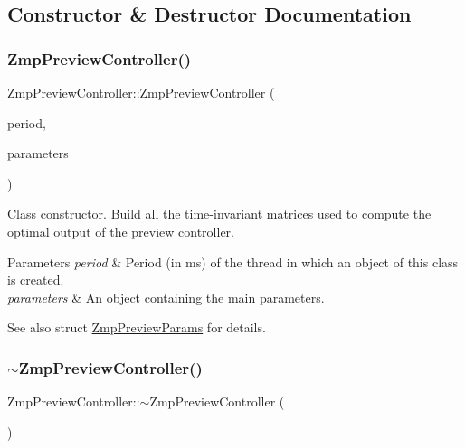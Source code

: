 \subsection{Constructor \& Destructor Documentation}
\hypertarget{classZmpPreviewController_af1c464b13886dc0edf2f295fc215b13c}{}\label{classZmpPreviewController_af1c464b13886dc0edf2f295fc215b13c} 
\subsubsection{\texorpdfstring{Zmp\+Preview\+Controller()}{ZmpPreviewController()}}
{\footnotesize\ttfamily Zmp\+Preview\+Controller\+::\+Zmp\+Preview\+Controller (\begin{DoxyParamCaption}\item[{const int}]{period,  }\item[{struct \hyperlink{structZmpPreviewParams}{Zmp\+Preview\+Params}}]{parameters }\end{DoxyParamCaption})}

Class constructor. Build all the time-\/invariant matrices used to compute the optimal output of the preview controller. 
\begin{DoxyParams}{Parameters}
{\em period} & Period (in ms) of the thread in which an object of this class is created. \\
\hline
{\em parameters} & An object containing the main parameters. \\
\hline
\end{DoxyParams}
\begin{DoxySeeAlso}{See also}
struct \hyperlink{structZmpPreviewParams}{Zmp\+Preview\+Params} for details. 
\end{DoxySeeAlso}
\hypertarget{classZmpPreviewController_af702c45f318c7a78310d19cc061886dd}{}\label{classZmpPreviewController_af702c45f318c7a78310d19cc061886dd} 
\subsubsection{\texorpdfstring{$\sim$\+Zmp\+Preview\+Controller()}{~ZmpPreviewController()}}
{\footnotesize\ttfamily Zmp\+Preview\+Controller\+::$\sim$\+Zmp\+Preview\+Controller (\begin{DoxyParamCaption}{ }\end{DoxyParamCaption})\hspace{0.3cm}{\ttfamily [virtual]}}



